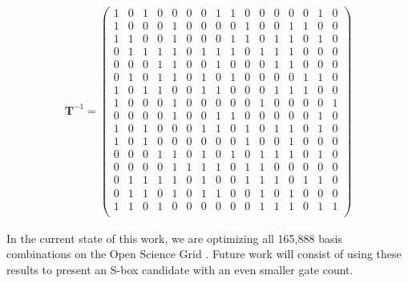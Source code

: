 \begin{align*}
\mathbf{T}^{-1} = 
\begin{pmatrix}
1 &0 &1 &0 &0 &0 &0 &1 &1 &0 &0 &0 &0 &0 &1 &0\\
1 &0 &0 &0 &1 &0 &0 &0 &0 &1 &0 &0 &1 &1 &0 &0\\
1 &1 &0 &0 &1 &0 &0 &0 &1 &1 &0 &1 &1 &0 &1 &0\\
0 &1 &1 &1 &1 &0 &1 &1 &1 &0 &1 &1 &1 &0 &0 &0\\
0 &0 &0 &1 &1 &0 &0 &1 &0 &0 &0 &1 &1 &0 &0 &0\\
0 &1 &0 &1 &1 &0 &1 &0 &1 &0 &0 &0 &0 &1 &1 &0\\
1 &0 &1 &1 &0 &0 &1 &1 &0 &0 &0 &1 &1 &1 &0 &0\\
1 &0 &0 &0 &1 &0 &0 &0 &0 &0 &1 &0 &0 &0 &0 &1\\
0 &0 &0 &0 &1 &0 &0 &1 &1 &0 &0 &0 &0 &0 &1 &0\\
1 &0 &1 &0 &0 &0 &1 &1 &0 &1 &0 &1 &1 &0 &1 &0\\
1 &0 &1 &0 &0 &0 &0 &0 &0 &1 &0 &0 &1 &0 &0 &0\\
0 &0 &0 &1 &1 &0 &1 &0 &1 &0 &1 &1 &1 &0 &1 &0\\
0 &0 &0 &0 &1 &1 &1 &1 &0 &1 &1 &0 &0 &0 &0 &0\\
0 &1 &1 &1 &1 &0 &1 &0 &0 &1 &1 &1 &0 &1 &1 &0\\
0 &1 &1 &0 &1 &0 &1 &1 &0 &0 &1 &0 &1 &0 &0 &0\\
1 &1 &0 &1 &0 &0 &0 &0 &0 &0 &1 &1 &1 &0 &1 &1\\
\end{pmatrix}
\end{align*}

In the current state of this work, we are optimizing all 165,888 basis combinations on the Open Science Grid \cite{Sfiligoi09-1} \cite{Pordes2008}. Future work will consist of using these results to present an S-box candidate with an even smaller gate count.
